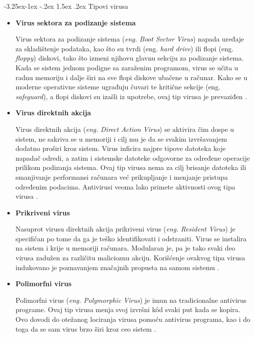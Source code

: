 \documentclass[a4paper]{article}
\makeatletter
\renewcommand\paragraph{\@startsection{paragraph}{4}{\z@}%
   {-3.25ex\@plus -1ex \@minus -.2ex}%
   {1.5ex \@plus .2ex}%
   {\normalfont\normalsize\bfseries}}
\makeatother
\begin{document}
\paragraph{Tipovi virusa}
\begin{itemize}
\item \textbf{Virus sektora za podizanje sistema}

Virus sektora za podizanje sistema (\textit{eng. Boot Sector Virus}) napada uređaje za skladištenje podataka, kao što su tvrdi (eng. \textit{hard drive}) ili flopi (eng. \textit{floppy}) diskovi, tako što izmeni njihovu glavnu sekciju za podizanje sistema. Kada se sistem jednom podigne sa zaraženim programom, virus se učita u radnu memoriju i dalje širi na sve flopi diskove ubačene u računar. Kako se u moderne operativne sisteme ugrađuju čuvari te kritične sekcije (eng. \textit{safeguard}), a flopi diskovi su izašli iz upotrebe, ovaj tip virusa je prevaziđen \cite{viruses_and_worms, computer_virus}.


\item \textbf{Virus direktnih akcija}

Virus direktnih akcija (\textit{eng. Direct Action Virus}) se aktivira čim dospe u sistem, ne sakriva se u memoriji i cilj mu je da se svakim izvršavanjem dodatno proširi kroz sistem. Virus inficira najpre tipove datoteka koje napadač odredi, a zatim i sistemske datoteke odgovorne za određene operacije prilikom podizanja sistema. Ovaj tip virusa nema za cilj brisanje datoteka ili smanjivanje performansi računara već prikupljanje i menjanje pristupa određenim podacima. Antivirusi veoma lako primete aktivnosti ovog tipa virusa \cite{directaction}.


\item \textbf{Prikriveni virus}

Nasuprot virusu direktnih akcija prikriveni virus (\textit{eng. Resident Virus}) je specifičan po tome da ga je teško identifikovati i odstraniti. Virus se instalira na sistem i krije u memoriji računara. Modularan je, pa je tako svaki deo virusa zadužen za različitu malicioznu akciju. Korišćenje ovakvog tipa virusa indukovano je poznavanjem značajnih propusta na samom sistemu \cite{computer_virus}.

\item \textbf{Polimorfni virus}

Polimorfni virus (\textit{eng. Polymorphic Virus}) je imun na tradicionalne antivirus programe. Ovaj tip virusa menja svoj izvršni kôd svaki put kada se kopira. Ovo dovodi do otežanog lociranja virusa pomoću antivirus programa, kao i do toga da se sam virus brzo širi kroz ceo sistem \cite{computer_virus}.


\end{itemize}
\end{document}

